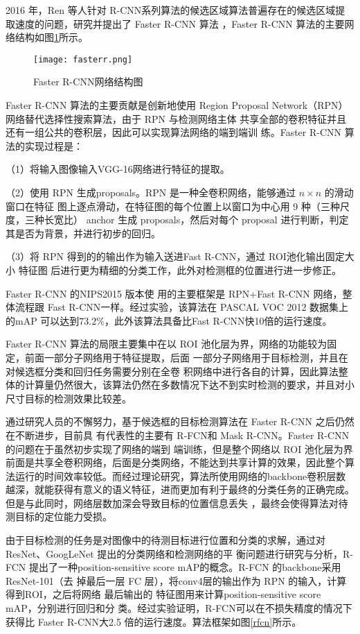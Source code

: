 2016 年，Ren 等人针对 R-CNN系列算法的候选区域算法普遍存在的候选区域提取速度的问题，研究并提出了 Faster R-CNN 算法
\cite{ren2015faster}，Faster R-CNN 算法的主要网络结构如图\ref{fasterr}所示。

\begin{figure}[htbp]
    \centering
    \texttt{[image: fasterr.png]}
    \caption{Faster R-CNN网络结构图\cite{ren2015faster}}
    \label{fasterr}
\end{figure}

Faster R-CNN 算法的主要贡献是创新地使用 Region
Proposal Network（RPN）网络替代选择性搜索算法，由于 RPN 与检测网络主体
共享全部的卷积特征并且还有一组公共的卷积层，因此可以实现算法网络的端到端训
练。Faster R-CNN 算法的实现过程是：

（1）将输入图像输入VGG-16网络进行特征的提取。

（2）使用 RPN 生成proposals。RPN 是一种全卷积网络，能够通过 $n \times n$ 的滑动窗口在特征
图上逐点滑动，在特征图的每个位置上以窗口为中心用 9 种（三种尺度，三种长宽比）
anchor 生成 proposals，然后对每个 proposal 进行判断，判定其是否为背景，并进行初步的回归。

（3）将 RPN 得到的的输出作为输入送进Fast R-CNN，通过 ROI池化输出固定大小 特征图 后进行更为精细的分类工作，此外对检测框的位置进行进一步修正。

Faster R-CNN 的NIPS2015 版本使
用的主要框架是 RPN+Fast R-CNN 网络，整体流程跟 Fast R-CNN一样。经过实验，该算法在 PASCAL VOC 2012 数据集上的mAP 可以达到$73.2\%$，此外该算法具备比Fast R-CNN快10倍的运行速度。

Faster R-CNN 算法的局限主要集中在以 ROI 池化层为界，网络的功能较为固定，前面一部分子网络用于特征提取，后面
一部分子网络用于目标检测，并且在对候选框分类和回归任务需要分别在全卷
积网络中进行各自的计算，因此算法整体的计算量仍然很大，该算法仍然在多数情况下达不到实时检测的要求，并且对小尺寸目标的检测效果比较差。

通过研究人员的不懈努力，基于候选框的目标检测算法在 Faster R-CNN 之后仍然在不断进步，目前具
有代表性的主要有 R-FCN\cite{dai2016r}和 Mask R-CNN\cite{he2017mask}。Faster R-CNN 的问题在于虽然初步实现了网络的端到
端训练，但是整个网络以 ROI 池化层为界前面是共享全卷积网络，后面是分类网络，不能达到共享计算的效果，因此整个算
法运行的时间效率较低。而经过理论研究，算法所使用网络的backbone卷积层数越深，就能获得有意义的语义特征，进而更加有利于最终的分类任务的正确完成。但是与此同时，网络层数加深会导致目标的位置信息丢失
，最终会使得算法对待测目标的定位能力受损。

由于目标检测的任务是对图像中的待测目标进行位置和分类的求解，通过对ResNet、GoogLeNet
提出的分类网络和检测网络的平
衡问题进行研究与分析，R-FCN 提出了一种position-sensitive score mAP的概念。R-FCN 的backbone采用ResNet-101（去
掉最后一层 FC 层），将conv4层的输出作为 RPN 的输入，计算得到ROI，之后将网络
最后输出的 特征图用来计算position-sensitive score mAP，分别进行回归和分
类。经过实验证明，R-FCN可以在不损失精度的情况下获得比 Faster R-CNN大2.5 倍的运行速度。算法框架如图\ref{rfcn}所示。

